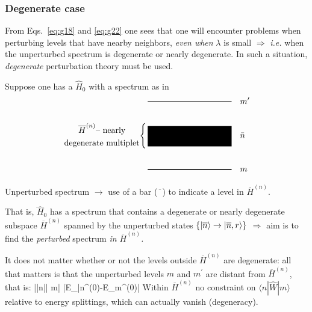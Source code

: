 \documentclass[12pt]{article}
\begin{document}


\subsubsection{Degenerate case}

From Eqs.~\eqref{eq:g18} and \eqref{eq:g22} one sees that one will
encounter problems when perturbing levels
that have nearby neighbors, \emph{even when} $\lambda$ is small
$\Rightarrow$ \textit{i.e.} when the unperturbed spectrum
is degenerate or nearly degenerate.
In such a situation, \emph{degenerate} perturbation
theory must be used.

Suppose one has a $\hat{H}_0$ with a spectrum as in
\[
\begin{aligned}
&\,\text{\rule[0.5ex]{10em}{1pt}}\quad m^\prime\\
\\
%
\left.%
\begin{gathered}
\overline{H}^{(n)}\text{-- nearly}\\
\text{degenerate multiplet}
\end{gathered}
\right\{
%
&\,\text{\rule[-10pt]{10em}{24pt}}\quad \bar{n}\\
\\
&\,\text{\rule[0.5ex]{10em}{1pt}}\quad m
\end{aligned}
\]

Unperturbed spectrum $\to$ 
use of a bar ($\overline{\phantom{x}}$)
to indicate a level in $\overline{H}^{(n)}$.

That is, $\hat{H}_0$ has a spectrum that contains a
degenerate or nearly degenerate subspace $\overline{H}^{(n)}$ spanned
by the unperturbed states $\{\ket{\overline{n}} \to \ket{\overline{n},r} \}$
$\Rightarrow$ aim is to find the \emph{perturbed} spectrum \emph{in $\overline{H}^{(n)}$.}


It does not matter whether or not the levels outside
$\overline{H}^{(n)}$ are degenerate: all that matters is that the
unperturbed levels $m$ and $m^\prime$ are distant from
$\overline{H}^{(n)}$, that is: %
\setcounter{equation}{24} %
\be
|\lambda\langle\bar{n}|| m\rangle| \ll \left|E_{\bar{n}}^{(0)}-E_{m}^{(0)}\right|
\ee
Within $\overline{H}^{(n)}$ no constraint on $\langle n|\hat{W}| m\rangle$
relative to energy splittings, which can actually
vanish (degeneracy).
\end{document}
